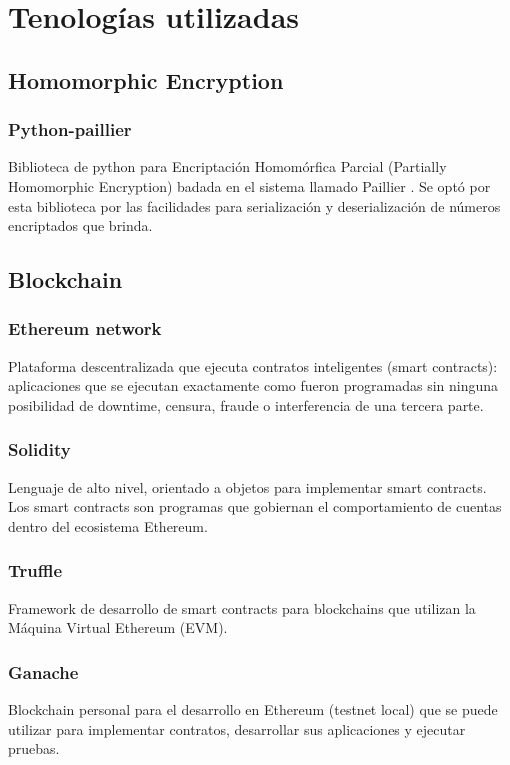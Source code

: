 \documentclass[
11pt, %
oneside, %
spanish, %
singlespacing, %
parskip, %
headsepline, %
chapterinoneline, %
]{MastersDoctoralThesis} %
\begin{document}

\chapter{Tenologías utilizadas}

\section*{Homomorphic Encryption}

\subsection*{Python-paillier \cite{python-paillier}}
Biblioteca de python para Encriptación Homomórfica Parcial (Partially Homomorphic Encryption) badada en el sistema  llamado Paillier \cite{paillier}. Se optó por esta biblioteca por las facilidades para serialización y deserialización de números encriptados que brinda.  

\section*{Blockchain}

\subsection*{Ethereum network \cite{eth}}
Plataforma descentralizada que ejecuta contratos inteligentes (smart contracts): aplicaciones que se ejecutan exactamente como fueron programadas sin ninguna posibilidad de downtime, censura, fraude o interferencia de una tercera parte.

\subsection*{Solidity \cite{sol}}
Lenguaje de alto nivel, orientado a objetos para implementar smart contracts. Los smart contracts son programas que gobiernan el comportamiento de cuentas dentro del ecosistema Ethereum.

\subsection*{Truffle \cite{tr}}
Framework de desarrollo de smart contracts para blockchains que utilizan la Máquina Virtual Ethereum (EVM).

\subsection*{Ganache \cite{gch}}
Blockchain personal para el desarrollo en Ethereum (testnet local) que se puede utilizar para implementar contratos, desarrollar sus aplicaciones y ejecutar pruebas.
\end{document}
